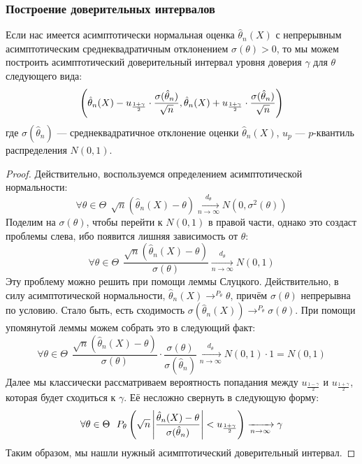 \subsubsection{Построение доверительных интервалов}

\begin{proposition}
	Если  нас имеется асимптотически нормальная оценка $\hat{\theta}_n(X)$ с непрерывным асимптотическим среднеквадратичным отклонением $\sigma(\theta) > 0$, то мы можем построить асимптотический доверительный интервал уровня доверия $\gamma$ для $\theta$ следующего вида:
	\[
		\left(\hat{\theta}_n(X) - u_{\frac{1 + \gamma}{2}} \cdot \frac{\sigma(\hat{\theta}_n)}{\sqrt{n}}, \hat{\theta}_n(X) + u_{\frac{1 + \gamma}{2}} \cdot \frac{\sigma(\hat{\theta}_n)}{\sqrt{n}}\right)
	\]
	где $\sigma(\hat{\theta}_n)$ --- среднеквадратичное отклонение оценки $\hat{\theta}_n(X)$, $u_p$ --- $p$-квантиль распределения $N(0, 1)$.
\end{proposition}

\begin{proof}
	Действительно, воспользуемся определением асимптотической нормальности:
	\[
		\forall \theta \in \Theta\ \ \sqrt{n}(\hat{\theta}_n(X) - \theta) \xrightarrow[n \to \infty]{d_\theta} N(0, \sigma^2(\theta))
	\]
	Поделим на $\sigma(\theta)$, чтобы перейти к $N(0, 1)$ в правой части, однако это создаст проблемы слева, ибо появится лишняя зависимость от $\theta$:
	\[
		\forall \theta \in \Theta\ \ \frac{\sqrt{n}(\hat{\theta}_n(X) - \theta)}{\sigma(\theta)} \xrightarrow[n \to \infty]{d_\theta} N(0, 1)
	\]
	Эту проблему можно решить при помощи леммы Слуцкого. Действительно, в силу асимптотической нормальности, $\hat{\theta}_n(X) \to^{P_\theta} \theta$, причём $\sigma(\theta)$ непрерывна по условию. Стало быть, есть сходимость $\sigma(\hat{\theta}_n(X)) \to^{P_\theta} \sigma(\theta)$. При помощи упомянутой леммы можем собрать это в следующий факт:
	\[
		\forall \theta \in \Theta\ \ \frac{\sqrt{n}(\hat{\theta}_n(X) - \theta)}{\sigma(\theta)} \cdot \frac{\sigma(\theta)}{\sigma(\hat{\theta}_n)} \xrightarrow[n \to \infty]{d_\theta} N(0, 1) \cdot 1 = N(0, 1)
	\]
	Далее мы классически рассматриваем вероятность попадания между $u_{\frac{1 - \gamma}{2}}$ и $u_{\frac{1 + \gamma}{2}}$, которая будет сходиться к $\gamma$. Её несложно свернуть в следующую форму:
	\[
		\forall \theta \in \Theta\ \ P_\theta\ps{\sqrt{n}\md{\frac{\hat{\theta}_n(X) - \theta}{\sigma(\hat{\theta}_n)}} < u_{\frac{1 + \gamma}{2}}} \xrightarrow[n \to \infty]{} \gamma
	\]
	Таким образом, мы нашли нужный асимптотический доверительный интервал.
\end{proof}

